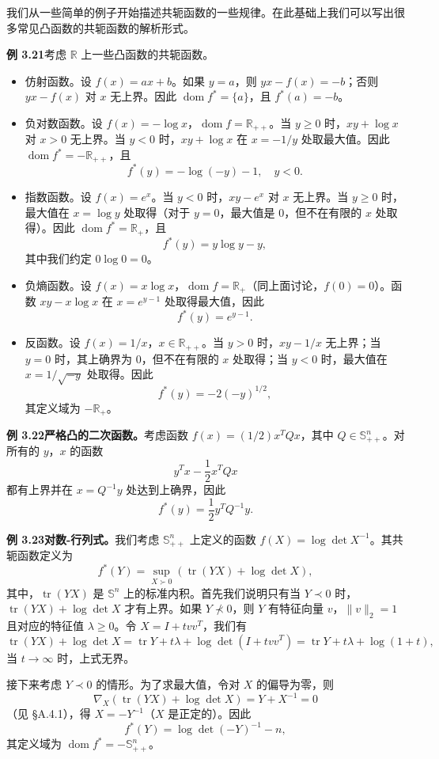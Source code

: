 \documentclass[UTF8,12pt,a4paper,fontset=fandol]{ctexart}
\DeclareMathOperator{\dom}{dom}
\begin{document}
我们从一些简单的例子开始描述共轭函数的一些规律。在此基础上我们可以写出很多常见凸函数的共轭函数的解析形式。

\noindent\textbf{例 3.21}\quad 考虑 $\mathbb{R}$ 上一些凸函数的共轭函数。
\begin{itemize}
\item 仿射函数。设 $f(x)=ax+b$。如果 $y=a$，则 $yx-f(x)=-b$；否则 $yx-f(x)$ 对 $x$ 无上界。因此 $\dom f^*=\{a\}$，且 $f^*(a)=-b$。
\item 负对数函数。设 $f(x)=-\log x$，$\dom f=\mathbb{R}_{++}$。当 $y\geq0$ 时，$xy+\log x$ 对 $x>0$ 无上界。当 $y<0$ 时，$xy+\log x$ 在 $x=-1/y$ 处取最大值。因此 $\dom f^*=-\mathbb{R}_{++}$，且
\[
f^*(y)=-\log(-y)-1,\quad y<0.
\]
\item 指数函数。设 $f(x)=e^x$。当 $y<0$ 时，$xy-e^x$ 对 $x$ 无上界。当 $y\geq0$ 时，最大值在 $x=\log y$ 处取得（对于 $y=0$，最大值是 $0$，但不在有限的 $x$ 处取得）。因此 $\dom f^*=\mathbb{R}_+$，且
\[
f^*(y)=y\log y-y,
\]
其中我们约定 $0\log0=0$。
\item 负熵函数。设 $f(x)=x\log x$，$\dom f=\mathbb{R}_+$（同上面讨论，$f(0)=0$）。函数 $xy-x\log x$ 在 $x=e^{y-1}$ 处取得最大值，因此
\[
f^*(y)=e^{y-1}.
\]
\item 反函数。设 $f(x)=1/x$，$x\in\mathbb{R}_{++}$。当 $y>0$ 时，$xy-1/x$ 无上界；当 $y=0$ 时，其上确界为 $0$，但不在有限的 $x$ 处取得；当 $y<0$ 时，最大值在 $x=1/\sqrt{-y}$ 处取得。因此
\[
f^*(y)=-2(-y)^{1/2},
\]
其定义域为 $-\mathbb{R}_+$。
\end{itemize}

\noindent\textbf{例 3.22\quad 严格凸的二次函数。}\quad 考虑函数 $f(x)=(1/2)x^TQx$，其中 $Q\in\mathbb{S}_{++}^n$。对所有的 $y$，$x$ 的函数
\[
y^Tx-\frac{1}{2}x^TQx
\]
都有上界并在 $x=Q^{-1}y$ 处达到上确界，因此
\[
f^*(y)=\frac{1}{2}y^TQ^{-1}y.
\]

\noindent\textbf{例 3.23\quad 对数-行列式。}\quad 我们考虑 $\mathbb{S}_{++}^n$ 上定义的函数 $f(X)=\log\det X^{-1}$。其共轭函数定义为
\[
f^*(Y)=\sup_{X\succ0}\left(\operatorname{tr}(YX)+\log\det X\right),
\]
其中，$\operatorname{tr}(YX)$ 是 $\mathbb{S}^n$ 上的标准内积。首先我们说明只有当 $Y\prec0$ 时，$\operatorname{tr}(YX)+\log\det X$ 才有上界。如果 $Y\nprec0$，则 $Y$ 有特征向量 $v$，$\|v\|_2=1$ 且对应的特征值 $\lambda\geq0$。令 $X=I+tvv^T$，我们有
\[
\operatorname{tr}(YX)+\log\det X
=\operatorname{tr}Y+t\lambda+\log\det(I+tvv^T)
=\operatorname{tr}Y+t\lambda+\log(1+t),
\]
当 $t\to\infty$ 时，上式无界。

接下来考虑 $Y\prec0$ 的情形。为了求最大值，令对 $X$ 的偏导为零，则
\[
\nabla_X\left(\operatorname{tr}(YX)+\log\det X\right)=Y+X^{-1}=0
\]
（见 \S A.4.1），得 $X=-Y^{-1}$（$X$ 是正定的）。因此
\[
f^*(Y)=\log\det(-Y)^{-1}-n,
\]
其定义域为 $\dom f^*=-\mathbb{S}_{++}^n$。
\end{document}
